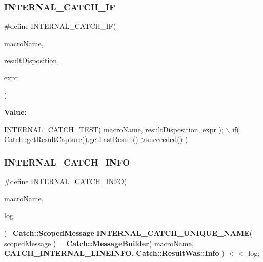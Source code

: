 \subsubsection{I\+N\+T\+E\+R\+N\+A\+L\+\_\+\+C\+A\+T\+C\+H\+\_\+\+IF}
{\footnotesize\ttfamily \#define I\+N\+T\+E\+R\+N\+A\+L\+\_\+\+C\+A\+T\+C\+H\+\_\+\+IF(\begin{DoxyParamCaption}\item[{}]{macro\+Name,  }\item[{}]{result\+Disposition,  }\item[{}]{expr }\end{DoxyParamCaption})}

{\bfseries Value\+:}
\begin{DoxyCode}
INTERNAL_CATCH_TEST( macroName, resultDisposition, expr ); \(\backslash\)
    if( Catch::getResultCapture().getLastResult()->succeeded() )
\end{DoxyCode}
\mbox{\label{catch_8hpp_ab0eb5cfab90a80f3113f0ecb65c62a1c}} 
\subsubsection{I\+N\+T\+E\+R\+N\+A\+L\+\_\+\+C\+A\+T\+C\+H\+\_\+\+I\+N\+FO}
{\footnotesize\ttfamily \#define I\+N\+T\+E\+R\+N\+A\+L\+\_\+\+C\+A\+T\+C\+H\+\_\+\+I\+N\+FO(\begin{DoxyParamCaption}\item[{}]{macro\+Name,  }\item[{}]{log }\end{DoxyParamCaption})~\textbf{ Catch\+::\+Scoped\+Message} \textbf{ I\+N\+T\+E\+R\+N\+A\+L\+\_\+\+C\+A\+T\+C\+H\+\_\+\+U\+N\+I\+Q\+U\+E\+\_\+\+N\+A\+ME}( scoped\+Message ) = \textbf{ Catch\+::\+Message\+Builder}( macro\+Name, \textbf{ C\+A\+T\+C\+H\+\_\+\+I\+N\+T\+E\+R\+N\+A\+L\+\_\+\+L\+I\+N\+E\+I\+N\+FO}, \textbf{ Catch\+::\+Result\+Was\+::\+Info} ) $<$$<$ log;}

\mbox{\label{catch_8hpp_a0ff459dc5f7a595c42c49bb2cf973eff}} 
